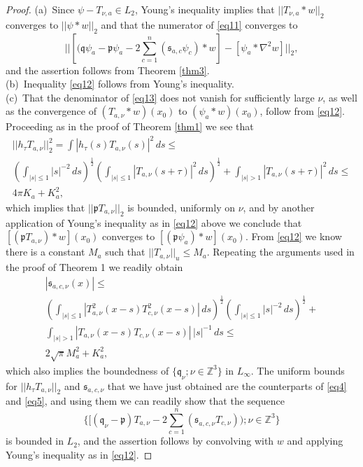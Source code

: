 \documentclass[10pt,a4paper]{amsart}
\newcommand{\IZ}{\text{${\mathbb{Z}}$}}
\newcommand{\half}{\mbox{$\frac{1}{2}$}}
\newcommand{\p}{\mathfrak{p}}
\newcommand{\q}{\mathfrak{q}}
\newcommand{\s}{\mathfrak{s}}
\begin{document}
\begin{proof}
(a)\ Since $\psi -  T_{\nu,a} \in L_2$, Young's inequality implies that $||T_{\nu,a} \ast w ||_2$ converges to $||\psi \ast w ||_2$ and that
the  numerator of \eqref{eq11} converges to 
\[
||[(\q\psi_{a} - \p \psi_{a} -2\sum_{c=1}^n (\s_{a,c}\psi_{c})\ast w ] -[\psi_{a}\ast \nabla^2w]||_2,
\]
and the assertion follows from Theorem \ref{thm3}.\\
(b)\ Inequality \eqref{eq12} follows from Young's inequality.\\
(c)\ That the denominator of \eqref{eq13} does not vanish for sufficiently large $\nu$, as well as the convergence of $(T_{a, \nu} \ast w)(x_0)$ to
$(\psi_a \ast w)(x_0)$, follow from \eqref{eq12}. 
Proceeding as in the proof of Theorem \ref{thm1} we see that
\begin{multline*}
||h_{\tau}T_{a,\nu} ||^2_2=\int |h_{\tau}(s)T_{a,\nu}(s)|^2 \,ds \le\\
\left (\int _{|s|\le1}|s|^{-2}\,ds \right)^{\half} \left (\int _{|s|\le1}|T_{a,\nu}(s+\tau)|^2 \,ds \right )^{\half} +\int_{|s| >1}|T_{a,\nu}(s+\tau)|^2 \,ds \le\\
4\pi K_a+K^2_a,
\end{multline*}
which implies that $||\p T_{a,\nu}||_2$ is bounded, uniformly on $\nu$, and by another application of Young's inequality
as in \eqref{eq12} above we conclude that $[(\p T_{a,\nu})\ast w](x_0)$ converges to $[(\p\psi_a)\ast w](x_0)$.
From \eqref{eq12} we know there is a constant $M_a$ such that $||T_{a,\nu}||_u \le M_a$. Repeating the arguments used in the proof of Theorem 1 we readily obtain
\begin{multline*}
|\s_{a,c,\nu}(x)| \le\\
 \left ( \int_{|s|\le 1}|T^2_{a,\nu}(x-s) T^2_{c,\nu}(x-s)|\,ds \right )^{\half} \left (\int_{|s|\le1}|s|^{-2}\, ds \right)^{\half} +\\
\int_{|s| > 1}|T_{a,\nu}(x-s) T_{c,\nu}(x-s)| \,|s|^{-1}\,ds\le\\
2 \sqrt{\pi} M_a^2+K^2_a,
\end{multline*}
which also implies the boundedness of $\{\q_{\nu}; \nu \in \IZ^3\}$ in $L_{\infty}$. The uniform bounds for 
$||h_{\tau}T_{a,\nu }||_2$ and $\s_{a,c,\nu}$ that we have just obtained are the counterparts of \eqref{eq4} and \eqref{eq5}, and using them we can readily show that the sequence 
\[
\{[( \q_{\nu}-\p )T_{a,\nu} -2\sum_{c=1}^n(\s_{a,c,\nu} T_{c,\nu}) ); \nu \in \IZ^3\}
\]
is bounded in $L_2$, and the assertion follows by convolving with $w$ and applying Young's inequality as in \eqref{eq12}.
\end{proof}
\end{document}
